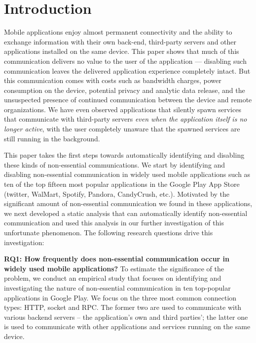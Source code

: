 \section{Introduction}
\label{sec:intro} 

Mobile applications enjoy almost permanent connectivity and the
ability to exchange information with their own back-end, third-party
servers and other applications installed on the same device.  This
paper shows that much of this communication delivers no value to the
user of the application --- disabling such communication leaves the
delivered application experience completely intact.  But this
communication comes with costs such as bandwidth charges, power
consumption on the device, potential privacy and analytic data
release, and the unsuspected presence of continued communication
between the device and remote organizations. We have even observed
applications that silently spawn services that communicate with
third-party servers {\em even when the application itself is no longer
active}, with the user completely unaware that the spawned services are
still running in the background.

This paper takes the first steps towards automatically identifying and
disabling these kinds of non-essential communications. We start by
identifying and disabling non-essential communication in 
widely used mobile applications such as ten of the top fifteen most
popular applications in the Google Play App Store (twitter, WalMart,
Spotify, Pandora, CandyCrush, etc.). Motivated by the significant
amount of non-essential communication we found in these applications, 
we next developed a static analysis that can automatically identify 
non-essential communication and used this analysis in our
further investigation of this unfortunate phenomenon. The following
research questions drive this investigation:

\vspace{0.1in}
\noindent 
{\bf RQ1: How frequently does non-essential communication occur in
  widely used mobile applications?}  To estimate the significance of
the problem, we conduct an empirical study that focuses on identifying
and investigating the nature of non-essential communication in ten
top-popular applications in Google Play.  We focus on the three most
common connection types: HTTP, socket and RPC.  The former two are
used to communicate with various backend servers -- the application's
own and third parties'; the latter one is used to communicate with
other applications and services running on the same device.

